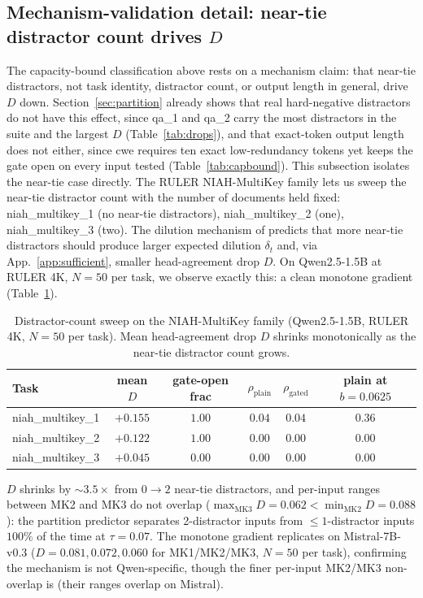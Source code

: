 \subsection{Mechanism-validation detail: near-tie distractor count drives \texorpdfstring{$D$}{D}}

The capacity-bound classification above rests on a mechanism claim: that
near-tie distractors, not task identity, distractor count, or output
length in general, drive $D$ down. Section~\ref{sec:partition} already
shows that real hard-negative distractors do not have this effect, since
qa\_1 and qa\_2 carry the most distractors in the suite and the largest
$D$ (Table~\ref{tab:drops}), and that exact-token output length does not
either, since cwe requires ten exact low-redundancy tokens yet keeps the
gate open on every input tested (Table~\ref{tab:capbound}). This
subsection isolates the near-tie case
directly. The RULER NIAH-MultiKey family lets us sweep the near-tie
distractor count with the number of documents held fixed:
niah\_multikey\_1 (no near-tie distractors), niah\_multikey\_2 (one),
niah\_multikey\_3 (two). The dilution mechanism of
\citet{arxiv260509649} predicts that more near-tie distractors should
produce larger expected dilution $\delta_t$ and, via
App.~\ref{app:sufficient}, smaller head-agreement drop $D$. On
Qwen2.5-1.5B at RULER 4K, $N = 50$ per task, we observe exactly this: a
clean monotone gradient (Table~\ref{tab:distractor}).

\begin{table}[t]
\centering
\caption{Distractor-count sweep on the NIAH-MultiKey family
(Qwen2.5-1.5B, RULER 4K, $N = 50$ per task). Mean head-agreement drop
$D$ shrinks monotonically as the near-tie distractor count grows.}
\label{tab:distractor}
\begin{tabular}{lccccc}
\toprule
Task & mean $D$ & gate-open frac & $\rho_{\mathrm{plain}}$ & $\rho_{\mathrm{gated}}$ & plain at $b{=}0.0625$ \\
\midrule
niah\_multikey\_1 & $+0.155$ & $1.00$ & $0.04$ & $0.04$ & $0.36$ \\
niah\_multikey\_2 & $+0.122$ & $1.00$ & $0.00$ & $0.00$ & $0.00$ \\
niah\_multikey\_3 & $+0.045$ & $0.00$ & $0.00$ & $0.00$ & $0.00$ \\
\bottomrule
\end{tabular}
\end{table}

$D$ shrinks by $\sim 3.5\times$ from $0 \to 2$ near-tie distractors,
and per-input ranges between MK2 and MK3 do not overlap
($\max_{\text{MK3}} D = 0.062 < \min_{\text{MK2}} D = 0.088$): the
partition predictor separates 2-distractor inputs from
$\leq 1$-distractor inputs $100\%$ of the time at $\tau = 0.07$. The
monotone gradient replicates on Mistral-7B-v0.3 ($D = 0.081, 0.072,
0.060$ for MK1/MK2/MK3, $N = 50$ per task), confirming the mechanism
is not Qwen-specific, though the finer per-input MK2/MK3 non-overlap is
(their ranges overlap on Mistral).

